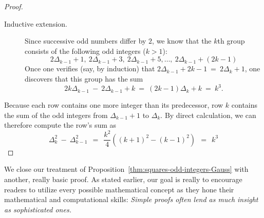 \begin{proof}
\begin{description}
\medskip

\item[{\sf Inductive extension}.]
%
Since successive odd numbers differ by $2$, we know that the $k$th
group consists of the following odd integers ($k>1$):
\[
2 \Delta_{k-1} +1, \ 2 \Delta_{k-1}  +3, \ 2 \Delta_{k-1}  +5 ,
\ldots, \
2 \Delta_{k-1} + (2k-1)
\]
Once one verifies (say, by induction) that $2 \Delta_{k-1} +2k-1 \ = \ 2
\Delta_{k} +1$, one discovers that this group has the sum
\[
2k \Delta_{k-1} \ - \ 2 \Delta_{k-1} +k \ = \
(2k -1) \Delta_k + k \ = \ k^3.
\]
\end{description}


Because each row contains one more integer than its predecessor, row
$k$ contains the sum of the odd integers from $\Delta_{k-1}+1$ to
$\Delta_k$.  By direct calculation, we can therefore compute the row's
sum as
\[
\Delta_k^2 \ - \ \Delta_{k-1}^2 
 \ \ =  \ \ \frac{k^2}{4} \left( (k+1)^2 - (k-1)^2 \right)
 \ \ = \ \ k^3
\]
\end{proof}

\bigskip

We close our treatment of
Proposition~\ref{thm:squares-odd-integers-Gauss} with another, really
basic proof.  As stated earlier, our goal is really to encourage
readers to utilize every possible mathematical concept as they hone
their mathematical and computational skills: {\em Simple proofs often
lend as much insight as sophisticated ones.}

\medskip


